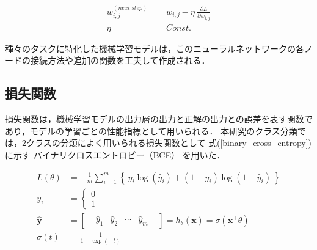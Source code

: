 \documentclass[12pt,a4j,dvipdfmx]{jreport}
\begin{document}
\begin{align}
  w_{i, j}^{(next~ step)} &= w_{i, j} - \eta~ \frac{\partial L}{\partial w_{i, j}}
  \label{nn_update_weight}
  \\
  \eta &= Const.
  \label{nn_learning_rate}
\end{align}

種々のタスクに特化した機械学習モデルは，このニューラルネットワークの各ノードの接続方法や追加の関数を工夫して作成される．

\subsection{損失関数}
\label{subsection_loss_function}
損失関数は，機械学習モデルの出力層の出力と正解の出力との誤差を表す関数であり，モデルの学習ごとの性能指標として用いられる\cite{aurellen20}．
本研究のクラス分類では，2クラスの分類によく用いられる損失関数として
式(\ref{binary_cross_entropy})に示す
バイナリクロスエントロピー（BCE）
を用いた．



\begin{align}
  L(\theta)&=
  -\frac{1}{m} \sum_{i=1}^{m}
  \left\{~
    y_{i} \log \left(\hat{y}_{i}\right)+\left(1-y_{i}\right) \log \left(1-\hat{y}_{i}\right)
  ~\right\}
  \label{binary_cross_entropy}
  \\[6pt]
  y_{i}&=\left\{
    \begin{array}{l}
      0 \\
      1 
    \end{array}
  \right.
  \label{logistic_predict}
  \\[6pt]
  \hat{\bm{y}}
  &=
  \begin{bmatrix}
    &
    \hat{y}_{1}& \hat{y}_{2}& \cdots& \hat{y}_{m}
    &
  \end{bmatrix}
  =h_{\theta}(\bm{x})
  =\sigma\left(\bm{x}^{\top} \theta\right)
  \label{logistic_probability}
  \\[6pt]
  \sigma(t)&=\frac{1}{1+\exp (-t)}
  \label{sigmoid}
\end{align}
\end{document}
